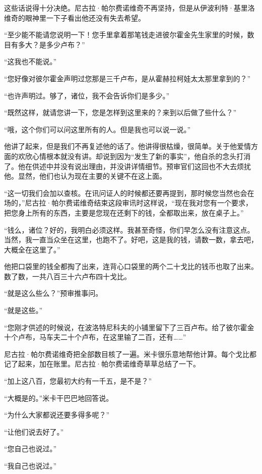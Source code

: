 \par 这些话说得十分决绝。尼古拉·帕尔费诺维奇不再坚持，但是从伊波利特·基里洛维奇的眼神里一下子看出他还没有失去希望。
\par “至少能不能请您说明一下！您手里拿着那笔钱走进彼尔霍金先生家里的时候，数目有多大？是多少卢布？”
\par “这我也不能说。”
\par “您好像对彼尔霍金声明过您那是三千卢布，是从霍赫拉柯娃太太那里拿到的？”
\par “也许声明过。够了，诸位，我不会告诉你们是多少。”
\par “既然这样，就请您讲一下，您是怎样到这里来的？来到以后做了些什么？”
\par “哦，这个你们可以问这里所有的人。但是我也可以说一说。”
\par 他讲了起来，但是我们不再复述他的话了。他讲得很枯燥，很简单。关于他爱情方面的欢欣心情根本就没有讲。却说到因为“发生了新的事实”，他自杀的念头打消了。他在供述中并没有说出理由，并没讲详情细节。预审官们这回也不大去烦扰他。显然，他们也认为现在主要的关键不在这上面。
\par “这一切我们会加以查核。在讯问证人的时候都还要再提到，那时候您当然也会在场的，”尼古拉·帕尔费诺维奇结束这段审讯时这样说，“现在我对您有一个要求，把您身上所有的东西，主要是您现在还剩下的钱，全都取出来，放在桌子上。”
\par “钱么，诸位？好的，我明白必须这样。我甚至奇怪，你们早怎么没有注意这点。当然，我一直当众坐在这里，也跑不了。好吧，这是我的钱，请数一数，拿去吧，大概全在这里了。”
\par 他把口袋里的钱全都掏了出来，连背心口袋里的两个二十戈比的钱币也取了出来。数了数，一共八百三十六卢布四十戈比。
\par “就是这么些么？”预审推事问。
\par “就是这些。”
\par “您刚才供述的时候说，在波洛特尼科夫的小铺里留下了三百卢布。给了彼尔霍金十个卢布，马车夫二十个卢布，在这里输了二百，还有……”
\par 尼古拉·帕尔费诺维奇把全部数目核了一遍。米卡很乐意地帮他计算。每个戈比都记了起来，加在账里。尼古拉·帕尔费诺维奇草草总结了一下。
\par “加上这八百，您最初大约有一千五，是不是？”
\par “大概是的。”米卡干巴巴地回答说。
\par “为什么大家都说还要多得多呢？”
\par “让他们说去好了。”
\par “您自己也说过。”
\par “我自己也说过。”
